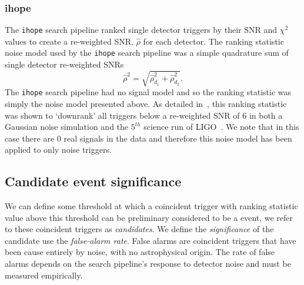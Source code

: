 \subsubsection{\label{2:sec:ihope}ihope}

The \verb|ihope| search pipeline ranked single detector triggers by their SNR and $\chi^{2}$ values to create a re-weighted SNR, $\hat{\rho}$ for each detector. The ranking statistic noise model used by the \verb|ihope| search pipeline was a simple quadrature sum of single detector re-weighted SNRs
%
\begin{equation}
    \hat{\rho}^{2} = \sqrt{\hat{\rho}^{2}_{d_{1}} + \hat{\rho}^{2}_{d_{2}}}.
    \label{2:eq:IHOPE_noise_model}
\end{equation}
%
The \verb|ihope| search pipeline had no signal model and so the ranking statistic was simply the noise model presented above. As detailed in~\cite{IHOPE:2012zx}, this ranking statistic was shown to `downrank' all triggers below a re-weighted SNR of $6$ in both a Gaussian noise simulation and the $5^{th}$ science run of LIGO~\cite{S5:2012}. We note that in this case there are $0$ real signals in the data and therefore this noise model has been applied to only noise triggers.

\subsection{\label{2:sec:background-estimation}Candidate event significance}

We can define some threshold at which a coincident trigger with ranking statistic value above this threshold can be preliminary considered to be a \gwadj event, we refer to these coincident triggers as \textit{candidates}. We define the \textit{significance} of the candidate use the \textit{false-alarm rate}. False alarms are coincident triggers that have been cause entirely by noise, with no astrophysical origin. The rate of false alarms depends on the search pipeline's response to detector noise and must be measured empirically.

